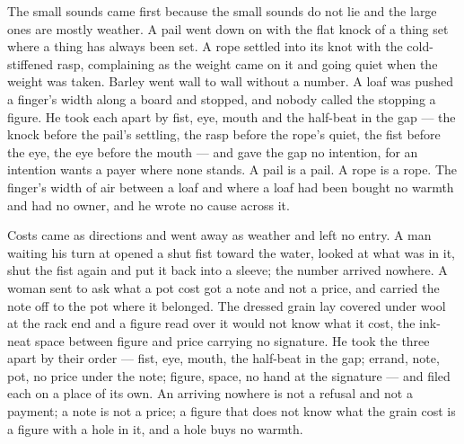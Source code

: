 The small sounds came first because the small sounds do not lie and the large ones are mostly weather. A pail went down on  with the flat knock of a thing set where a thing has always been set. A rope settled into its knot with the cold-stiffened rasp, complaining as the weight came on it and going quiet when the weight was taken. Barley went wall to wall without a number. A loaf was pushed a finger's width along a board and stopped, and nobody called the stopping a figure. He took each apart by fist, eye, mouth and the half-beat in the gap --- the knock before the pail's settling, the rasp before the rope's quiet, the fist before the eye, the eye before the mouth --- and gave the gap no intention, for an intention wants a payer where none stands. A pail is a pail. A rope is a rope. The finger's width of air between a loaf and where a loaf had been bought no warmth and had no owner, and he wrote no cause across it.

Costs came as directions and went away as weather and left no entry. A man waiting his turn at  opened a shut fist toward the water, looked at what was in it, shut the fist again and put it back into a sleeve; the number arrived nowhere. A woman sent to ask what a pot cost got a note and not a price, and carried the note off to the pot where it belonged. The dressed grain lay covered under wool at the rack end and a figure read over it would not know what it cost, the ink-neat space between figure and price carrying no signature. He took the three apart by their order --- fist, eye, mouth, the half-beat in the gap; errand, note, pot, no price under the note; figure, space, no hand at the signature --- and filed each on a place of its own. An arriving nowhere is not a refusal and not a payment; a note is not a price; a figure that does not know what the grain cost is a figure with a hole in it, and a hole buys no warmth.

